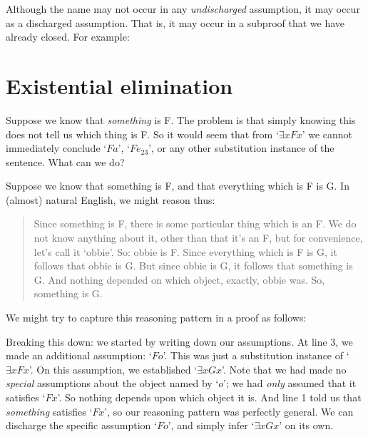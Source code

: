 Although the name may not occur in any \emph{undischarged} assumption, it may occur as a discharged assumption. That is, it may occur in a subproof that we have already closed. For example:
\begin{fitchproof}
	\open
	\close
\end{fitchproof}

\section{Existential elimination}
Suppose we know that \emph{something} is F. The problem is that simply knowing this does not tell us which thing is F. So it would seem that from `$\exists x Fx$' we cannot immediately conclude `$Fa$', `$Fe_{23}$', or any other substitution instance of the sentence. What can we do?

Suppose we know that something is F, and that everything which is F is G. In (almost) natural English, we might reason thus:
	\begin{quote}
		Since something is F, there is some particular thing which is an F. We do not know anything about it, other than that it's an F, but for convenience, let's call it `obbie'. So: obbie is F. Since everything which is F is G, it follows that obbie is G. But since obbie is G, it follows that something is G. And nothing depended on which object, exactly, obbie was. So, something is G.
	\end{quote}
We might try to capture this reasoning pattern in a proof as follows:
\begin{fitchproof}
	\open
		 
	\close
\end{fitchproof}\noindent
Breaking this down: we started by writing down our assumptions. At line 3, we made an additional assumption: `$Fo$'. This was just a substitution instance of `$\exists x Fx$'. On this assumption, we established `$\exists x Gx$'. Note that we had made no \emph{special} assumptions about the object named by `$o$'; we had \emph{only} assumed that it satisfies `$Fx$'. So nothing depends upon which object it is. And line 1 told us that \emph{something} satisfies `$Fx$', so our reasoning pattern was perfectly general. We can discharge the specific assumption `$Fo$', and simply infer `$\exists x Gx$' on its own.


